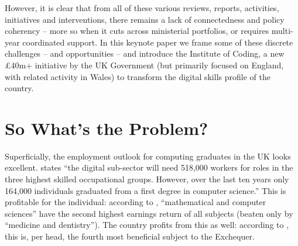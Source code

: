\documentclass[sigconf]{acmart}
\begin{document}
However, it is clear that from all of these various reviews, reports,
activities, initiatives and interventions, there remains a lack of
connectedness and policy coherency -- more so when it cuts across
ministerial portfolios, or requires multi-year coordinated support. In
this keynote paper we frame some of these discrete challenges -- and
opportunities -- and introduce the Institute of Coding, a new
\pounds40m+ initiative by the UK Government (but primarily focused on
England, with related activity in Wales) to transform the digital
skills profile of the country.

\section{So What's the Problem?}\label{problem}

Superficially, the employment outlook for computing graduates in the
UK looks excellent. \cite[p.~74]{UKCES2015b} states
``the digital sub-sector will need 518,000 workers for
roles in the three highest skilled occupational groups. However, over
the last ten years only 164,000 individuals graduated from a first
degree in computer science.''
This is profitable for the individual: according to
\cite[Figure 4]{BIS2011a}, ``mathematical and computer sciences'' have
the second highest earnings return of all subjects (beaten only by
``medicine and dentistry'').  The country profits from this as well:
according to \cite[p.~16]{BIS2011a}, this is, per head, the fourth
most beneficial subject to the Exchequer.
\end{document}
